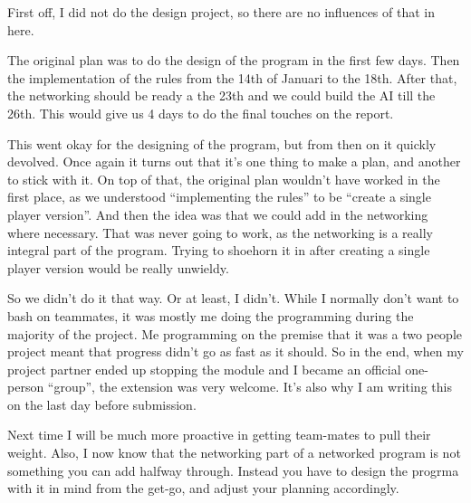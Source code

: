 \documentclass[12pt, letterpaper]{article}
\begin{document}
    First off, I did not do the design project, so there are no influences of that in here.

    The original plan was to do the design of the program in the first few days.
    Then the implementation of the rules from the 14th of Januari to the 18th.
    After that, the networking should be ready a the 23th and we could build the AI till the 26th.
    This would give us 4 days to do the final touches on the report.

    This went okay for the designing of the program, but from then on it quickly devolved.
    Once again it turns out that it's one thing to make a plan, and another to stick with it.
    On top of that, the original plan wouldn't have worked in the first place, as we understood
    ``implementing the rules'' to be ``create a single player version''.
    And then the idea was that we could add in the networking where necessary.
    That was never going to work, as the networking is a really integral part of the program.
    Trying to shoehorn it in after creating a single player version would be really unwieldy.

    So we didn't do it that way.
    Or at least, I didn't.
    While I normally don't want to bash on teammates, it was mostly me doing the programming during the majority of the
    project.
    Me programming on the premise that it was a two people project meant that progress didn't go as fast as it should.
    So in the end, when my project partner ended up stopping the module and I became an official one-person ``group'',
    the extension was very welcome.
    It's also why I am writing this on the last day before submission.

    Next time I will be much more proactive in getting team-mates to pull their weight.
    Also, I now know that the networking part of a networked program is not something you can add halfway through.
    Instead you have to design the progrma with it in mind from the get-go, and adjust your planning accordingly.
\end{document}
